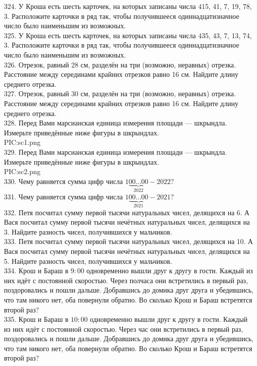 324. У Кроша есть шесть карточек, на которых записаны числа 415, 41, 7, 19, 78, 3. Расположите карточки в ряд так, чтобы получившееся одиннадцатизначное число было наименьшим из возможных.\\
325. У Кроша есть шесть карточек, на которых записаны числа 435, 43, 7, 13, 74, 3. Расположите карточки в ряд так, чтобы получившееся одиннадцатизначное число было наименьшим из возможных.\\
326. Отрезок, равный 28 см, разделён на три (возможно, неравных) отрезка. Расстояние между серединами крайних отрезков равно 16 см. Найдите длину среднего отрезка.\\
327. Отрезок, равный 30 см, разделён на три (возможно, неравных) отрезка. Расстояние между серединами крайних отрезков равно 16 см. Найдите длину среднего отрезка.\\
328. Перед Вами марсианская единица измерения площади --- шкрындла. Измерьте приведённые ниже фигуры в
шкрындлах.\\
{{PIC:sc1.png}}\\
329. Перед Вами марсианская единица измерения площади --- шкрындла. Измерьте приведённые ниже фигуры в
шкрындлах.\\
{{PIC:sc2.png}}\\
330. Чему равняется сумма цифр числа $1\underbrace{00\ldots00}_{2022}-2022?$\\
331. Чему равняется сумма цифр числа $1\underbrace{00\ldots00}_{2021}-2021?$\\
332. Петя посчитал сумму первой тысячи натуральных чисел, делящихся на 6. А Вася посчитал сумму первой тысячи нечётных натуральных чисел, делящихся на 3. Найдите разность чисел, получившихся у мальчиков.\\
333. Петя посчитал сумму первой тысячи натуральных чисел, делящихся на 10. А Вася посчитал сумму первой тысячи нечётных натуральных чисел, делящихся на 5. Найдите разность чисел, получившихся у мальчиков.\\
334. Крош и Бараш в $9:00$ одновременно вышли друг к другу в гости. Каждый из них идёт с постоянной скоростью. Через полчаса они встретились в первый раз, поздоровались и пошли дальше. Добравшись до домика друг друга и убедившись, что там никого нет, оба повернули обратно. Во сколько Крош и Бараш встретятся второй раз?\\
335. Крош и Бараш в $10:00$ одновременно вышли друг к другу в гости. Каждый из них идёт с постоянной скоростью. Через час они встретились в первый раз, поздоровались и пошли дальше. Добравшись до домика друг друга и убедившись, что там никого нет, оба повернули обратно. Во сколько Крош и Бараш встретятся второй раз?\\
